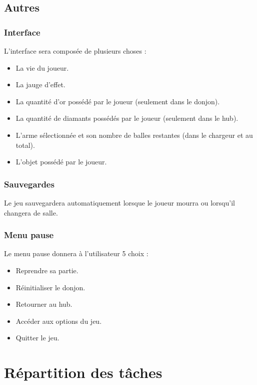 \documentclass[]{extarticle}
\begin{document}
	\subsection{Autres}
		\subsubsection{Interface}
\bigbreak
\bigbreak
L’interface sera composée de plusieurs choses :
\begin{itemize}
\item La vie du joueur.
\item La jauge d’effet.
\item La quantité d’or possédé par le joueur (seulement dans le donjon).
\item La quantité de diamants possédés par le joueur (seulement dans le hub).
\item L’arme sélectionnée et son nombre de balles restantes (dans le chargeur et au total).
\item L’objet possédé par le joueur.
\end{itemize}
\bigbreak

		\subsubsection{Sauvegardes}
\bigbreak
\bigbreak
Le jeu sauvegardera automatiquement lorsque le joueur mourra ou lorsqu’il changera de salle.
\bigbreak

		\subsubsection{Menu pause}
\bigbreak
\bigbreak
Le menu pause donnera à l’utilisateur 5 choix :
\begin{itemize}
\item Reprendre sa partie.
\item Réinitialiser le donjon.
\item Retourner au hub.
\item Accéder aux options du jeu.
\item Quitter le jeu.
\end{itemize}

\newpage
\section{Répartition des tâches}
\end{document}
